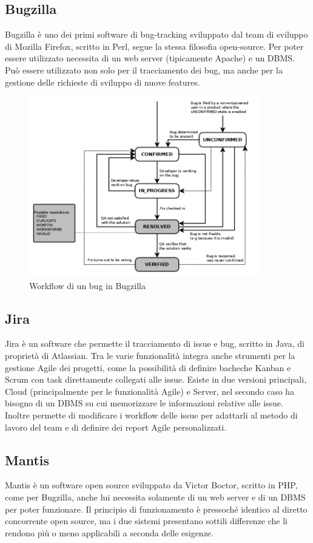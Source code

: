 \documentclass[a4paper, 12pt]{report}
\numberwithin{equation}{section}
\begin{document}
\subsection{Bugzilla}
Bugzilla è uno dei primi software di bug-tracking sviluppato dal team di sviluppo di Mozilla Firefox, scritto in Perl, segue la stessa filosofia open-source. Per poter essere utilizzato necessita di un web server (tipicamente Apache) e un DBMS. Può essere utilizzato non solo per il tracciamento dei bug, ma anche per la gestione delle richieste di sviluppo di nuove features.
\begin{figure}
    \centering
    \includegraphics[width=0.9\textwidth]{imgs/bugzilla.png}
    \caption{Workflow di un bug in Bugzilla \cite{bugzilla-doc}}
    \label{fig:bugzilla}
\end{figure}

\subsection{Jira}
Jira è un software che permette il tracciamento di issue e bug, scritto in Java, di proprietà di Atlassian. Tra le varie funzionalità integra anche strumenti per la gestione Agile dei progetti, come la possibilità di definire bacheche Kanban e Scrum con task direttamente collegati alle issue. Esiste in due versioni principali, Cloud (principalmente per le funzionalità Agile) e Server, nel secondo caso ha bisogno di un DBMS su cui memorizzare le informazioni relative alle issue. Inoltre permette di modificare i workflow delle issue per adattarli al metodo di lavoro del team e di definire dei report Agile personalizzati.
\subsection{Mantis}
Mantis è un software open source sviluppato da Victor Boctor, scritto in PHP, come per Bugzilla, anche lui necessita solamente di un web server e di un DBMS per poter funzionare. Il principio di funzionamento è pressoché identico al diretto concorrente open source, ma i due sistemi presentano sottili differenze che li rendono più o meno applicabili a seconda delle esigenze.
\end{document}
